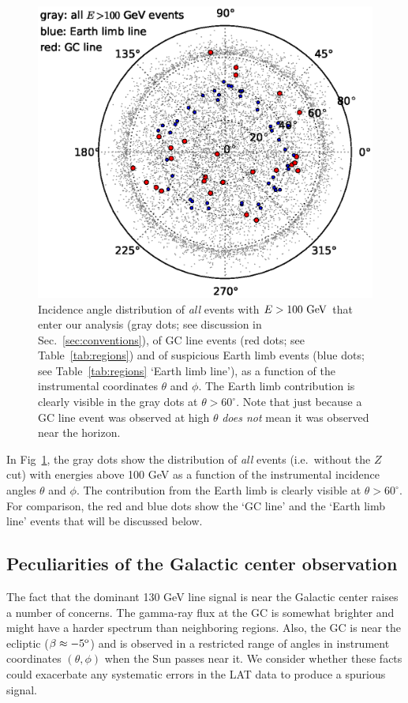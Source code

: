 \documentclass[aps,twocolumn,prd,superscriptaddress,showpacs,nofootinbib,fixfloat]{revtex4}
\newcommand{\GeV}{{\rm ~GeV}}
\newcommand{\degree}{^{\rm o}}
\begin{document}
\begin{figure}[h]
  \begin{center}
    \includegraphics[width=0.9\linewidth]{plots/polarCounts.eps}
    \vspace{-0.5cm}
  \end{center}
  \caption{Incidence angle distribution of \emph{all} events
  with $E>100\GeV$ that enter our analysis (gray dots; see
  discussion in Sec.~\ref{sec:conventions}), of GC line
  events (red dots; see Table~\ref{tab:regions}) and of
  suspicious Earth limb events (blue dots; see
  Table~\ref{tab:regions} `Earth limb line'), as a function of
  the instrumental coordinates $\theta$ and $\phi$. The
  Earth limb contribution is clearly visible in the gray
  dots at $\theta > 60^\circ$.  Note that just because a GC line event was
  observed at high $\theta$ \emph{does not} mean it was observed near the
  horizon.}
  \label{fig:phiThetaDist}
\end{figure}

In
Fig~\ref{fig:phiThetaDist}, the gray dots show the
distribution of \emph{all} events (i.e.~without the $Z$ cut)
with energies above 100 GeV as a function of the instrumental
incidence angles $\theta$ and $\phi$.
The contribution from the Earth limb is clearly visible at
$\theta>60^\circ$. For comparison, the red and blue dots
show the `GC line' and the `Earth limb line' events that
will be discussed below.

\subsection{Peculiarities of the Galactic center observation}
The fact that the dominant 130 GeV line signal is near the
Galactic center raises a number of concerns.  The gamma-ray
flux at the GC is somewhat brighter and might have a harder
spectrum than neighboring regions. Also, the GC is near the
ecliptic ($\beta \approx -5\degree$) and is observed in
a restricted range of angles in instrument coordinates
$(\theta, \phi)$ when the Sun passes near it.  We consider
whether these facts could exacerbate any systematic errors
in the LAT data to produce a spurious signal.
\end{document}
